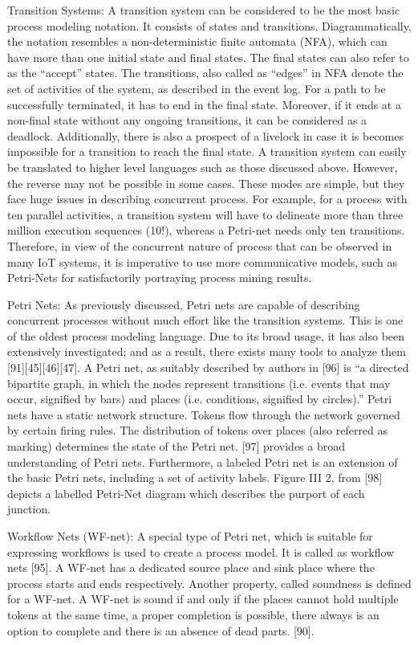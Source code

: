 Transition Systems: A transition system can be considered to be the most basic process modeling notation. It consists of states and transitions. Diagrammatically, the notation resembles a non-deterministic finite automata (NFA), which can have more than one initial state and final states. The final states can also refer to as the “accept” states. The transitions, also called as “edges” in NFA denote the set of activities of the system, as described in the event log. For a path to be successfully terminated, it has to end in the final state. Moreover, if it ends at a non-final state without any ongoing transitions, it can be considered as a deadlock. Additionally, there is also a prospect of a livelock in case it is becomes impossible for a transition to reach the final state. A transition system can easily be translated to higher level languages such as those discussed above. However, the reverse may not be possible in some cases. These modes are simple, but they face huge issues in describing concurrent process. For example, for a process with ten parallel activities, a transition system will have to delineate more than three million execution sequences (10!), whereas a Petri-net needs only ten transitions. Therefore, in view of the concurrent nature of process that can be observed in many IoT systems, it is imperative to use more communicative models, such as Petri-Nets for satisfactorily portraying process mining results.


Petri Nets: As previously discussed, Petri nets are capable of describing concurrent processes without much effort like the transition systems. This is one of the oldest process modeling language. Due to its broad usage, it has also been extensively investigated; and as a result, there exists many tools to analyze them [91][45][46][47]. A Petri net, as suitably described by authors in [96] is “a directed bipartite graph, in which the nodes represent transitions (i.e. events that may occur, signified by bars) and places (i.e. conditions, signified by circles).” Petri nets have a static network structure. Tokens flow through the network governed by certain firing rules. The distribution of tokens over places (also referred as marking) determines the state of the Petri net. [97] provides a broad understanding of Petri nets. Furthermore, a labeled Petri net is an extension of the basic Petri nets, including a set of activity labels. Figure III 2, from [98] depicts a labelled Petri-Net diagram which describes the purport of each junction.


Workflow Nets (WF-net): A special type of Petri net, which is suitable for expressing workflows is used to create a process model. It is called as workflow nets [95]. A WF-net has a dedicated source place and sink place where the process starts and ends respectively. Another property, called soundness is defined for a WF-net. A WF-net is sound if and only if the places cannot hold multiple tokens at the same time, a proper completion is possible, there always is an option to complete and there is an absence of dead parts. [90].


